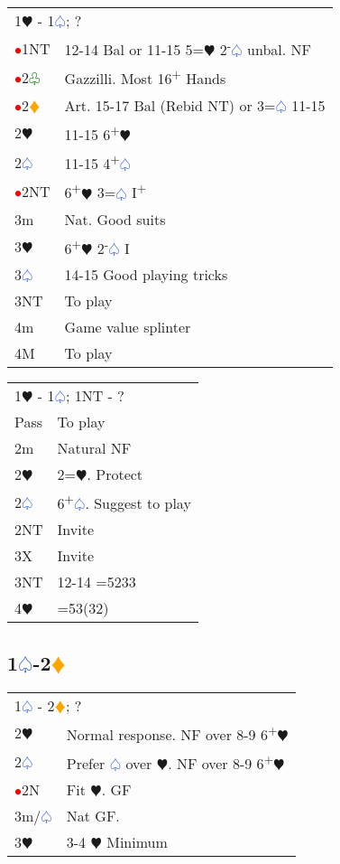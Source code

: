 \documentclass{article}
\renewcommand{\sp}{\textcolor{RoyalBlue}{$\varspade$}}
\newcommand{\he}{\textcolor{RubineRed}{$\varheart$}}
\newcommand{\di}{\textcolor{Orange}{$\vardiamond$}}
\newcommand{\cl}{\textcolor{Green}{$\varclub$}}
\newcommand{\nt}{\relsize{-1}NT\relsize{1}}
\newcommand{\up}{\textsuperscript{+}}
\newcommand{\down}{\textsuperscript{-}}
\newcommand{\al}{\textcolor{red}{$\bullet$}}
\begin{document}
\begin{tabular}{|l|p{6.5cm}}
	\multicolumn{2}{l}{1\he{} - 1\sp{}; ?} \\
	\al{}1\nt{} & 12-14 Bal or 11-15 5=\he{} 2\down{}\sp{} unbal. NF \\
	\al{}2\cl{} & Gazzilli. Most 16\up{} Hands \\
	\al{}2\di{} & Art. 15-17 Bal (Rebid \nt{}) or 3=\sp{} 11-15 \\
	2\he{} & 11-15 6\up\he{}\\
	2\sp{} & 11-15 4\up\sp{} \\
	\al{}2\nt{} & 6\up{}\he{} 3=\sp{} I\up{} \\
	3m & Nat. Good suits \\
	3\he{} & 6\up{}\he{} 2\down{}\sp{} I \\
	3\sp{} & 14-15 Good playing tricks \\
	3\nt{} & To play \\
	4m & Game value splinter \\
	4M & To play \\
\end{tabular}

\medskip

\begin{tabular}{|l|p{6.5cm}}
	\multicolumn{2}{l}{1\he{} - 1\sp{}; 1\nt{} - ?} \\
		Pass & To play \\
		2m & Natural NF \\
		2\he{} & 2=\he{}. Protect \\
		2\sp{} & 6\up{}\sp{}. Suggest to play \\
		2\nt{} & Invite \\
		3X & Invite \\
		3\nt{} & 12-14 =5233 \\
		4\he{} & =53(32) \\
\end{tabular}

\subsection{1\sp{}-2\di{}}

\begin{tabular}{|l|p{6.5cm}}
	\multicolumn{2}{l}{1\sp{} - 2\di{}; ? }\\
	2\he{} & Normal response. NF over 8-9 6\up{}\he{} \\
	2\sp{} & Prefer \sp{} over \he{}. NF over 8-9 6\up{}\he{} \\
	\al{}2N & Fit \he{}. GF \\
	3m/\sp{} & Nat GF. \\
	3\he{} & 3-4 \he{} Minimum \\
\end{tabular}
\end{document}
